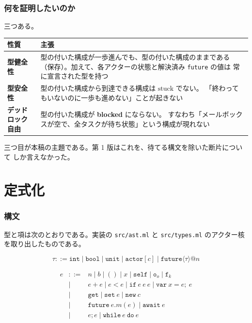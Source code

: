 \documentclass[11pt,a4paper]{ltjsarticle}
\makeatletter
\theoremstyle{definition}
\theoremstyle{remark}
\newcommand{\tint}{\ensuremath{\mathtt{int}}}
\newcommand{\tbool}{\ensuremath{\mathtt{bool}}}
\newcommand{\tunit}{\ensuremath{\mathtt{unit}}}
\newcommand{\tact}[1]{\ensuremath{\mathtt{actor}[#1]}}
\newcommand{\stuck}{\mathrm{stuck}}
\newcommand{\tfutl}[2]{\ensuremath{\mathtt{future}\langle #1 \rangle @ #2}}
\makeatother
\begin{document}
\section{何を証明したいのか}

三つある。

\begin{center}
\small
\begin{tabular}{@{}lp{9.4cm}@{}}
\toprule
性質 & 主張 \\
\midrule
\textbf{型健全性} & 型の付いた構成が一歩進んでも、型の付いた構成のままである
  （保存）。加えて、各アクターの状態と解決済み \texttt{future} の値は
  常に宣言された型を持つ \\
\textbf{型安全性} & 型の付いた構成から到達できる構成は $\stuck$ でない。
  「終わってもいないのに一歩も進めない」ことが起きない \\
\textbf{デッドロック自由} & 型の付いた構成が \textbf{blocked} にならない。
  すなわち「メールボックスが空で、全タスクが待ち状態」という構成が現れない \\
\bottomrule
\end{tabular}
\end{center}

三つ目が本稿の主題である。第 1 版はこれを、待てる構文を除いた断片について
しか言えなかった。

\part{定式化}
\label{part:form}

\section{構文}
\label{sec:syntax}

型と項は次のとおりである。実装の \texttt{src/ast.ml} と
\texttt{src/types.ml} のアクター核を取り出したものである。

\[
\tau ::= \tint \mid \tbool \mid \tunit \mid \tact{c} \mid \tfutl{\tau}{n}
\]

\[
\begin{array}{rcl}
e &::=& n \mid b \mid () \mid x \mid \mathtt{self}
      \mid \mathtt{o}_o \mid \mathtt{f}_k \\
  &\mid& e + e \mid e < e \mid \mathtt{if}\ e\ e\ e
      \mid \mathtt{var}\ x = e;\ e \\
  &\mid& \mathtt{get} \mid \mathtt{set}\ e \mid \mathtt{new}\ c \\
  &\mid& \mathtt{future}\ e.m(e) \mid \mathtt{await}\ e \\
  &\mid& e ; e \mid \mathtt{while}\ e\ \mathtt{do}\ e
\end{array}
\]
\end{document}
